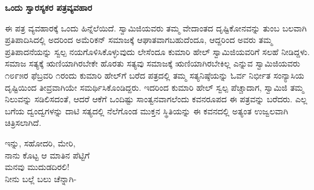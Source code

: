 \begin{myquote}
\end{myquote}

\begin{myquote}
\end{myquote}

\selectkan

\begin{center}
\textbf{ಒಂದು ಸ್ವಾರಸ್ಯಕರ ಪತ್ರವ್ಯವಹಾರ}
\end{center}

ಈ ಪತ್ರ ವ್ಯವಹಾರಕ್ಕೆ ಒಂದು ಹಿನ್ನೆಲೆಯಿದೆ. ಸ್ವಾಮಿಜಿಯವರು ತಮ್ಮ ವೇದಾಂತದ ದೃಷ್ಟಿಕೋನವನ್ನು ತುಂಬ ಬಲವಾಗಿ ಪ್ರತಿಪಾದಿಸಿದಲ್ಲಿ ಅದರಿಂದ ಅಮೆರಿಕನ್ ಸಮಾಜಕ್ಕೆ ಆಘಾತವಾಗಬಹುದೆಂದೂ, ಆದ್ದರಿಂದ ಅವರು ತಮ್ಮ ಪ್ರತಿಪಾದನೆಯನ್ನು ಸ್ವಲ್ಪ ನಯಗೊಳಿಸಿಕೊಳ್ಳುವುದು ಲೇಸೆಂದೂ ಕುಮಾರಿ ಹೇಲ್ ಸ್ವಾಮಿಜಿಯವರಿಗೆ ಸಲಹೆ ನೀಡಿದ್ದಳು. ಸಮಾಜ ಸತ್ಯಕ್ಕೆ ಋಣಿಯಾಗಿರಬೇಕೇ ಹೊರತು ಸತ್ಯವು ಸಮಾಜಕ್ಕೆ ಋಣಿಯಾಗಿರಬೇಕಿಲ್ಲ ಎನ್ನುವ ಸ್ವಾಮಿಜಿಯವರು ೧೮೯೫ರ ಫೆಬ್ರವರಿ ೧ರಂದು ಕುಮಾರಿ ಹೇಲ್‌ಗೆ ಬರೆದ ಪತ್ರದಲ್ಲಿ ತಮ್ಮ ಸತ್ಯನಿಷ್ಠೆಯನ್ನು ಓರ್ವ ನಿರ್ಭೀತ ಸಂನ್ಯಾಸಿಯ ದೃಷ್ಟಿಯಿಂದ ತೀವ್ರವಾಗಿಯೇ ಸಮರ್ಥಿಸಿಕೊಂಡಿದ್ದರು. ಇದರಿಂದ ಕುಮಾರಿ ಹೇಲ್ ಸ್ವಲ್ಪ ಪೆಚ್ಚಾದಾಗ, ಸ್ವಾಮಿಜಿ ತಮ್ಮ ನಿಲುವನ್ನು ಸಡಿಲಿಸದಂತೆ, ಆದರೆ ಆಕೆಗೆ ಒಂದಿಷ್ಟು ಸಾಂತ್ವನವಾಗಲೆಂದು ಕವನರೂಪದ ಈ ಪತ್ರವನ್ನು ಬರೆದರು. ಎಲ್ಲ ಬಗೆಯ ದ್ವಂದ್ವಗಳನ್ನು ದಾಟಿ ಸತ್ಯದಲ್ಲಿ ನೆಲೆಗೊಂಡ ಮುಕ್ತನ ಸ್ಥಿತಿಯನ್ನು ಈ ಕವನದಲ್ಲಿ ಅತ್ಯಂತ ಉಜ್ವಲವಾಗಿ ಚಿತ್ರಿಸಲಾಗಿದೆ.

\begin{myquote}
ಇನ್ನು, ಸಹೋದರಿ, ಮೇರಿ,\\ನಾನು ಕೊಟ್ಟ ಆ ಮಾತಿನ ಪೆಟ್ಟಿಗೆ\\ಮನವು ಮುದುಡದಿರಲಿ!\\ನೀನು ಬಲ್ಲೆ ಬಲು ಚೆನ್ನಾಗಿ-
\end{myquote}

